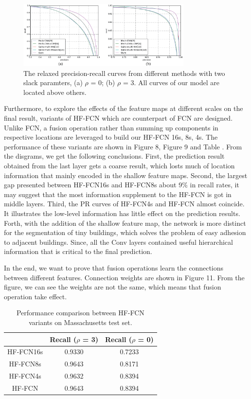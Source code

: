 \begin{figure}
\centering
\includegraphics[width=8.7cm]{Figures/HF-FCN_dataset_a.eps}
\caption{The relaxed precision-recall curves from different methods with two slack paramters, (a) $\rho$ = 0; (b) $\rho$ = 3. All curves of our model are located above others.}
\label{7}
\end{figure}
\setlength{\parindent}{2ex}Furthermore, to explore the effects of the feature maps at different scales on the final result, variants of HF-FCN which are counterpart of FCN are designed. Unlike FCN, a fusion operation rather than summing up components in respective locations are leveraged to build our HF-FCN 16s, 8s, 4s. The performance of these variants are shown in Figure 8, Figure 9 and Table . From the disgrams, we get the following conclusions. First, the prediction result obtained from the last layer gets a coarse result, which losts much of location information that mainly encoded in the shallow feature maps. Second, the largest gap presented between HF-FCN16s and HF-FCN8s about 9{\%} in recall rates, it may suggest that the most information supplement to the HF-FCN is got in middle layers. Third, the PR curves of HF-FCN4s and HF-FCN almost coincide. It illustrates the low-level information has little effect on the prediction results. Forth, with the addition of the shallow feature map, the network is more distinct for the segmentation of tiny buildings, which solves the problem of easy adhesion to adjacent buildings. Since, all the Conv layers contained useful hierarchical information that is critical to the final prediction.\par
\setlength{\parindent}{2ex}In the end, we want to prove that fusion operations learn the connections between different features. Connection weights are shown in Figure 11. From the figure, we can see the weights are not the same, which means that fusion operation take effect.
\begin{table}
\centering
\caption {Performance comparison between HF-FCN variants on Massachusetts test set.}
\begin{tabular}{ccc}
\hline
&Recall ($\rho$ = 3)&Recall ($\rho$ = 0)\\
\hline
HF-FCN16s&0.9330&0.7233\\
HF-FCN8s&0.9643&0.8171\\
HF-FCN4s&0.9632&0.8394\\
HF-FCN&0.9643&0.8394\\
\hline
\end{tabular}
\end{table}


